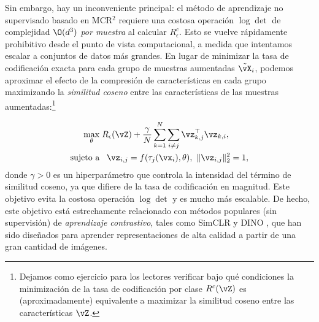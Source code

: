 \documentclass[../../book-main.tex]{subfiles}
\begin{document}
Sin embargo, hay un inconveniente principal: el método de aprendizaje no supervisado basado en MCR$^2$
requiere una costosa operación $\log \det$ de complejidad $\O(d^3)$
\textit{por muestra} al calcular $R^c_\epsilon$. Esto
se vuelve rápidamente prohibitivo desde el punto de vista computacional, a medida que intentamos escalar a
conjuntos de datos más grandes. En lugar de minimizar la tasa de codificación exacta para cada
grupo de muestras aumentadas $\tilde{\vX}_{i}$, podemos aproximar el
efecto de la compresión de características en cada grupo maximizando la {\em
similitud coseno} entre las características de las muestras
aumentadas:\footnote{Dejamos como ejercicio para los lectores verificar
    bajo qué condiciones la minimización de la tasa de codificación por clase
    $R^c(\vZ)$ es (aproximadamente) equivalente a maximizar la similitud coseno
entre las características $\vZ$.}

\begin{equation}
    \begin{aligned}
        \max_{\theta } & \;  R_{\epsilon}(\vZ) +
        \frac{\gamma}{N}\sum_{k=1}^N \sum_{i \neq j}
        \vz_{k,j}^\top \vz_{k,i}, \\
        \mbox{sujeto a} &  \ \ \, \vz_{i,j} = f(\tau_j(\vx_i),\theta),\
        \|\vz_{i,j}\|_2^2                                          = 1,
    \end{aligned}
    \label{eqn:maximal-rate-reduction-unsupervised-simdino}
\end{equation}
donde $\gamma > 0$ es un hiperparámetro que controla la intensidad
del término de similitud coseno, ya que difiere de la tasa de codificación en
magnitud. Este objetivo evita la costosa operación $\log \det$ y
es mucho más escalable. De hecho, este objetivo está estrechamente relacionado con
métodos populares (sin supervisión) de {\em aprendizaje contrastivo}, tales como
SimCLR \cite{chen2020simple} y DINO \cite{caron2021emerging}, que
han sido diseñados para aprender representaciones de alta calidad a partir de
una gran cantidad de imágenes.
\end{document}
